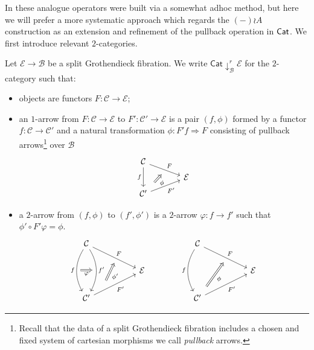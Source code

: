 \documentclass[a4paper,10pt
,draft
]{article}%
\renewcommand{\1}{\eta}%
\begin{document}
In \cite{BP_geo} these analogue operators were built via a somewhat adhoc method, but here we will prefer a more systematic approach which regards the $(-) \wr A$ construction as an extension and refinement of the pullback operation in $\mathsf{Cat}$.
We first introduce relevant $2$-categories.


\begin{definition}
Let $\mathcal{E} \to \mathcal{B}$ be a split Grothendieck fibration.
We write $\mathsf{Cat}\downarrow^r_{\mathcal{B}} \mathcal{E}$ for the $2$-category such that:
\begin{itemize}
	\item objects are functors $F \colon \mathcal{C} \to \mathcal{E}$; 
	
	\item an $1$-arrow from 
	$F \colon \mathcal{C} \to \mathcal{E}$
	to
	$F' \colon \mathcal{C}' \to \mathcal{E}$
	is a pair $(f,\phi)$
	formed by a functor $f\colon \mathcal{C} \to \mathcal{C}'$ and a natural transformation $\phi \colon F' f \Rightarrow F$ consisting of pullback arrows\footnote{Recall that the data of a split Grothendieck fibration includes a chosen and fixed system of cartesian morphisms we call \textit{pullback} arrows.} over $\mathcal{B}$
		\begin{equation}
		\begin{tikzcd}[row sep = tiny, column sep = 35pt]
			\mathcal{C} \arrow{dr}[name=U]{F} \arrow{dd}[swap]{f}
		\\
			& \mathcal{E}
		\\
			|[alias=V]| \mathcal{C}' \arrow{ur}[swap]{F'}
		\arrow[Rightarrow, from=V, to=U,shorten >=0.25cm,shorten <=0.25cm
		,swap,"\phi"
		]
		\end{tikzcd}
		\end{equation}
	\item a $2$-arrow from $(f,\phi)$ to $(f',\phi')$ is a $2$-arrow $\varphi \colon f \to f'$ such that
	$\phi' \circ F' \varphi = \phi$.
		\begin{equation}
		\begin{tikzcd}[column sep = 50pt]
			\mathcal{C} \arrow{dr}[name=U]{F} 
			\arrow[bend right]{dd}[swap]{f}[name=F]{}
			\arrow[bend left]{dd}{f'}[swap,name=FF]{}
			&
		&
			\mathcal{C} \arrow{dr}[name=U2]{F} 
			\arrow[bend right]{dd}[swap]{f}
			&
		\\
			& \mathcal{E}
		&
			& \mathcal{E}
		\\
			\mathcal{C}' \arrow{ur}[swap]{F'}[near start, name=V]{}
			&
		&
			|[alias=V2]| \mathcal{C}' \arrow{ur}[swap]{F'}
			&
		\arrow[Rightarrow, from=V, to=U,shorten >=0.25cm,shorten <=0.25cm
		,swap,"\phi'"
		]
		\arrow[Rightarrow, from=F, to=FF,shorten >=0.0cm,shorten <=0.0cm
		,swap,"\varphi"
		]
		\arrow[Rightarrow, from=V2, to=U2,shorten >=0.25cm,shorten <=0.25cm
		,swap,"\phi"
		]
		\end{tikzcd}
		\end{equation}
\end{itemize}
\end{definition}
\end{document}
